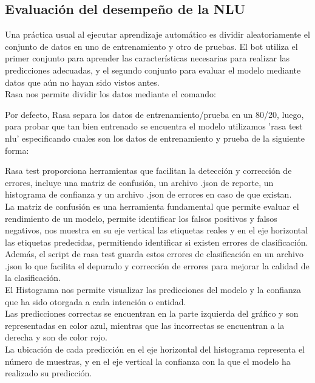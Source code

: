 \subsection{Evaluación del desempeño de la NLU}
Una práctica usual al ejecutar aprendizaje automático es dividir aleatoriamente el conjunto de
datos en uno de entrenamiento y otro de pruebas. El bot utiliza el primer conjunto para aprender
las características necesarias para realizar las predicciones adecuadas, y el segundo conjunto para
evaluar el modelo mediante datos que aún no hayan sido vistos antes.\\
Rasa nos permite dividir los datos mediante el comando:

\begin{center}
\end{center}

Por defecto, Rasa separa los datos de entrenamiento/prueba en un 80/20, luego, para probar que tan
bien entrenado se encuentra el modelo utilizamos 'rasa test nlu' especificando cuales son los datos
de entrenamiento y prueba de la siguiente forma:\\

\begin{center}
\end{center}

Rasa test proporciona herramientas que facilitan la detección y corrección de errores, incluye una
matriz de confusión, un archivo .json de reporte, un histograma de confianza y un archivo .json de
errores en caso de que existan.\\
\indent La matriz de confusión es una herramienta fundamental que permite evaluar el rendimiento de
un
modelo, permite identificar los falsos positivos y falsos negativos, nos muestra en su eje vertical
las etiquetas reales y en el eje horizontal las etiquetas predecidas, permitiendo identificar si
existen errores de clasificación.\\
\indent Además, el script de rasa test guarda estos errores de clasificación en un archivo .json lo
que
facilita el depurado y corrección de errores para mejorar la calidad de la clasificación.\\
\indent El Histograma nos permite visualizar las predicciones del modelo y la confianza que ha sido
otorgada a cada intención o entidad.\\
\indent Las predicciones correctas se encuentran en la parte izquierda del gráfico y son
representadas en
color azul, mientras que las incorrectas se encuentran a la derecha y son de color rojo.\\
\indent La ubicación de cada predicción en el eje horizontal del histograma representa el número de
muestras, y en el eje vertical la confianza con la que el modelo ha realizado su predicción.
\cite{interpretacion_graficos}

